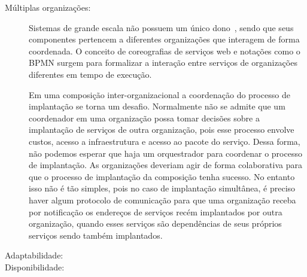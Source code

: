 \begin{description}
\item [Múltiplas organizações:]

Sistemas de grande escala não possuem um único dono~\cite{Steen2011VeryLarge}, 
sendo que seus componentes pertencem a diferentes organizações que interagem de forma coordenada. 
O conceito de coreografias de serviços web e notações como o BPMN surgem para 
formalizar a interação entre serviços de organizações diferentes em tempo de execução.

Em uma composição inter-organizacional a coordenação do processo de implantação se torna um desafio. Normalmente não se admite que um coordenador em uma organização possa tomar decisões 
sobre a implantação de serviços de outra organização, pois esse processo envolve
custos, acesso a infraestrutura e acesso ao pacote do serviço.
Dessa forma, não podemos esperar que haja um orquestrador para coordenar o processo de implantação.
As organizações deveriam agir de forma colaborativa para que o processo de implantação
da composição tenha sucesso.
No entanto isso não é tão simples, pois no caso de implantação simultânea,
é preciso haver algum protocolo de comunicação para que uma organização receba
por notificação os endereços de serviços recém implantados por outra organização,
quando esses serviços são dependências de seus próprios serviços sendo também implantados.

\item [Adaptabilidade:]

\item [Disponibilidade:]

\end{description}



